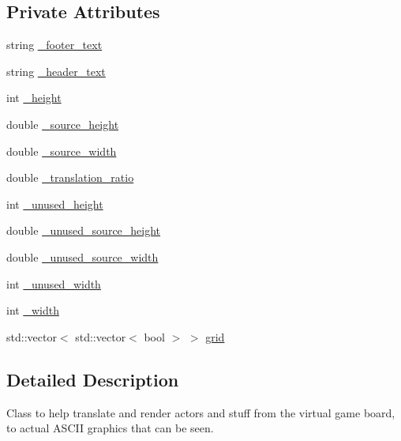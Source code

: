 \subsection*{Private Attributes}
\begin{DoxyCompactItemize}
\item 
string \hyperlink{classAsteroids_1_1UI_1_1ClientTextUI_1_1DisplayGrid_a2efe868935cdf0664ccc9fb526909644}{\+\_\+footer\+\_\+text}
\item 
string \hyperlink{classAsteroids_1_1UI_1_1ClientTextUI_1_1DisplayGrid_ac08ce94aad0ffa78ab934dd348c1d05a}{\+\_\+header\+\_\+text}
\item 
int \hyperlink{classAsteroids_1_1UI_1_1ClientTextUI_1_1DisplayGrid_ad6276b6308240eb47ed4bfde35c08584}{\+\_\+height}
\item 
double \hyperlink{classAsteroids_1_1UI_1_1ClientTextUI_1_1DisplayGrid_a6be16b048d8b4350ce46562b974b68eb}{\+\_\+source\+\_\+height}
\item 
double \hyperlink{classAsteroids_1_1UI_1_1ClientTextUI_1_1DisplayGrid_a8e8c5a59cdeab669f73f78a17ee46869}{\+\_\+source\+\_\+width}
\item 
double \hyperlink{classAsteroids_1_1UI_1_1ClientTextUI_1_1DisplayGrid_a541ceaabe467918053ff04714146bb33}{\+\_\+translation\+\_\+ratio}
\item 
int \hyperlink{classAsteroids_1_1UI_1_1ClientTextUI_1_1DisplayGrid_ae868a284f85a6c1b58690b8d8234ee82}{\+\_\+unused\+\_\+height}
\item 
double \hyperlink{classAsteroids_1_1UI_1_1ClientTextUI_1_1DisplayGrid_a48740e237aa4c1b381073e53f699a456}{\+\_\+unused\+\_\+source\+\_\+height}
\item 
double \hyperlink{classAsteroids_1_1UI_1_1ClientTextUI_1_1DisplayGrid_abd72f038f80e0109f41503ed6b26fd40}{\+\_\+unused\+\_\+source\+\_\+width}
\item 
int \hyperlink{classAsteroids_1_1UI_1_1ClientTextUI_1_1DisplayGrid_aab07512057cd22213ad9e0e1f06b9d4b}{\+\_\+unused\+\_\+width}
\item 
int \hyperlink{classAsteroids_1_1UI_1_1ClientTextUI_1_1DisplayGrid_aa112573df2e5975cb31932b501e5f0d9}{\+\_\+width}
\item 
std\+::vector$<$ std\+::vector$<$ bool $>$ $>$ \hyperlink{classAsteroids_1_1UI_1_1ClientTextUI_1_1DisplayGrid_afb1ace93d029332d54de18e60c625050}{grid}
\end{DoxyCompactItemize}


\subsection{Detailed Description}
Class to help translate and render actors and stuff from the virtual game board, to actual A\+S\+C\+II graphics that can be seen. 

